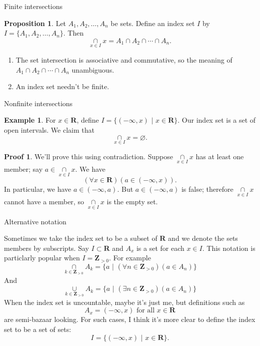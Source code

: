 \documentclass[fleqn]{beamer}
\newcommand{\reals}{\mathbf{R}}
\newcommand{\integers}{\mathbf{Z}}
\theoremstyle{definition}
\newtheorem{myex}{Example}
\newtheorem{myth}{Proposition}
\newtheorem{myproof}{Proof}
\begin{document}
\begin{frame}{Finite intersections}
\begin{myth} Let \(A_1, A_2, \dots, A_n\) be sets.  Define an index set \(I\) by  \(I = \{A_1, A_2, \dots, A_n \} \). Then
\[
   \underset{x \in I}{\cap} x = A_1 \cap A_2 \cap  \cdots \cap A_n.
\]
\end{myth}
\begin{enumerate}
  \item The set intersection  is associative and commutative, so  the meaning of \(A_1 \cap A_2 \cap \cdots \cap A_n \) unambiguous.

  \item An index set needn't be finite.
\end{enumerate}
\end{frame}

\begin{frame}{Nonfinite intersections}

\begin{myex}  For \(x \in \reals\), define \( I = \{ (-\infty, x) \,\, | \,\, x \in \reals \} \). Our index set is a set of open intervals.
We claim that
\[
    \underset{x \in I}{\cap} x  = \varnothing.
\]
\end{myex}

\begin{myproof}   We'll prove this using contradiction.  Suppose  \( \underset{x \in I}{\cap} x \) has at least one member; say \(a \in  \underset{x \in I}{\cap} x \). We have
\[
    (\forall x \in \reals)(a \in (-\infty, x)).
\]
In particular, we have \(a \in (-\infty, a)\).  But \(a \in (-\infty, a)\) is false; therefore \( \underset{x \in I}{\cap} x \) cannot have a member, so \( \underset{x \in I}{\cap} x \)  is the empty set.
\end{myproof}



\end{frame}

\begin{frame}{Alternative notation}

Sometimes we take the index set to be a subset of \(\reals\) and we denote the sets members by subscripts. Say \(I \subset \reals\) and  \(A_x\) is a set for each \(x \in I\).  This notation is particlarly
popular when \(I = \integers_{> 0}\).  For example
\[
  \underset{k  \in \integers_{> 0}} {\cap} A_k   = \{ a \,\, | \,\, (\forall n \in  \integers_{> 0})(a \in A_n) \}
\]
And
\[
  \underset{k  \in \integers_{> 0}} {\cup} A_k   = \{ a \,\, | \,\, (\exists  n \in  \integers_{> 0})(a \in A_n) \}
\]
When the index set is uncountable, maybe it's just me, but definitions such as
\[
   A_x = (-\infty, x)   \mbox{  for all } x \in \reals
\]
are semi-bazaar looking. For such cases, I think it's more clear to define the index set to be a set of sets:
\[
   I  =  \{ (-\infty, x)   \,\, | \,\, x \in \reals\}.
\]


\end{frame}
\end{document}
